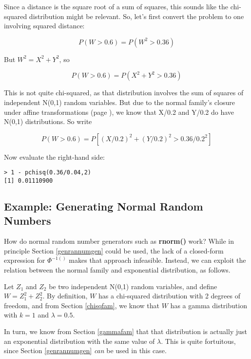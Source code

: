 Since a distance is the square root of a sum of squares, this sounds
like the chi-squared distribution might be relevant.  So, let's first
convert the problem to one involving squared distance:

\begin{equation}
P(W > 0.6) = P(W^2 > 0.36)
\end{equation}

But $W^2 = X^2 + Y^2$, so

\begin{equation}
P(W > 0.6) = P(X^2 + Y^2 > 0.36)
\end{equation}

This is not quite chi-squared, as that distribution involves the sum of
squares of independent N(0,1) random variables.  But due to the normal
family's closure under affine transformations (page \pageref{affine}),
we know that X/0.2 and Y/0.2 do have N(0,1) distributions.  So write

\begin{equation}
P(W > 0.6) = P[(X/0.2)^2 + (Y/0.2)^2 > 0.36/0.2^2]
\end{equation}

Now evaluate the right-hand side:

\begin{lstlisting}
> 1 - pchisq(0.36/0.04,2)
[1] 0.01110900
\end{lstlisting}

\subsection{Example:  Generating Normal Random Numbers}

How do normal random number generators such as {\bf rnorm()} work?
While in principle Section \ref{genrannumgen} could be used, the lack of
a closed-form expression for $\Phi^{-1()}$ makes that approach
infeasible.  Instead, we can exploit the relation between the normal
family and exponential distribution, as follows.

Let $Z_1$ and $Z_2$ be two independent N(0,1) random variables, and define
$W = Z_1^2 + Z_2^2$.  By definition, $W$ has a chi-squared distribution with
2 degrees of freedom, and from Section \ref{chisqfam}, we know that $W$
has a gamma distribution with $k = 1$ and $\lambda = 0.5$.

In turn, we know from Section \ref{gammafam} that that distribution is
actually just an exponential distribution with the same value of
$\lambda$.  This is quite fortuitous, since Section \ref{genrannumgen}
{\it can} be used in this case.

